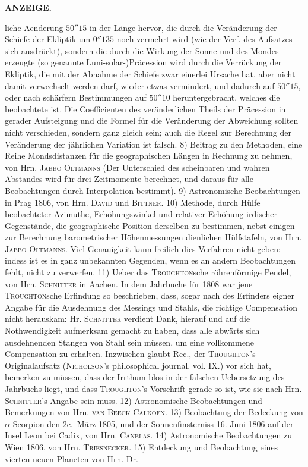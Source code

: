 \clearpage
\thispagestyle{empty}
\noindent{}%
%
\parbox[t]{\dimexpr\linewidth-24mm\relax}{\centering\footnotesize\bfseries ANZEIGE.\par}%
\makebox[12mm][r]{}\par\nobreak\medskip
\noindent liche Aenderung $50''15$ in der Länge hervor, die durch die Veränderung der Schiefe der Ekliptik um $0''135$ noch vermehrt wird (wie der Verf. des Aufsatzes sich ausdrückt), sondern die durch die Wirkung der Sonne und des Mondes erzeugte (so genannte Luni-solar-)Präcession wird durch die Verrückung der Ekliptik, die mit der Abnahme der Schiefe zwar einerlei Ursache hat, aber nicht damit verwechselt werden darf, wieder etwas vermindert, und dadurch auf $50''15$, oder nach schärfern Bestimmungen auf $50''10$ heruntergebracht, welches die beobachtete ist. Die Coefficienten des veränderlichen Theils der Präcession in gerader Aufsteigung und die Formel für die Veränderung der Abweichung sollten nicht verschieden, sondern ganz gleich sein; auch die Regel zur Berechnung der Veränderung der jährlichen Variation ist falsch. 8) Beitrag zu den Methoden, eine Reihe Mondsdistanzen für die geographischen Längen in Rechnung zu nehmen, von Hrn. \textsc{Jabbo Oltmanns} (Der Unterschied des scheinbaren und wahren Abstandes wird für drei Zeitmomente berechnet, und daraus für alle Beobachtungen durch Interpolation bestimmt). 9) Astronomische Beobachtungen in Prag 1806, von Hrn. \textsc{David} und \textsc{Bittner}. 10) Methode, durch Hülfe beobachteter Azimuthe, Erhöhungswinkel und relativer Erhöhung irdischer Gegenstände, die geographische Position derselben zu bestimmen, nebst einigen zur Berechnung barometrischer Höhenmessungen dienlichen Hülfstafeln, von Hrn. \textsc{Jabbo Oltmanns}. Viel Genauigkeit kann freilich dies Verfahren nicht geben: indess ist es in ganz unbekannten Gegenden, wenn es an andern Beobachtungen fehlt, nicht zu verwerfen. 11) Ueber das \textsc{Troughton}sche röhrenförmige Pendel, von Hrn. \textsc{Schnitter} in Aachen. In dem Jahrbuche für 1808 war jene \textsc{Troughton}sche Erfindung so beschrieben, dass, sogar nach des Erfinders eigner Angabe für die Ausdehnung des Messings und Stahls, die richtige Compensation nicht herauskam: Hr. \textsc{Schnitter} verdient Dank, hierauf und auf die Nothwendigkeit aufmerksam gemacht zu haben, dass alle abwärts sich ausdehnenden Stangen von Stahl sein müssen, um eine vollkommene Compensation zu erhalten. Inzwischen glaubt Rec., der \textsc{Troughton}'s Originalaufsatz (\textsc{Nicholson}'s philosophical journal. vol. IX.) vor sich hat, bemerken zu müssen, dass der Irrthum blos in der falschen Uebersetzung des Jahrbuchs liegt, und dass \textsc{Troughton}'s Vorschrift gerade so ist, wie sie nach Hrn. \textsc{Schnitter}'s Angabe sein muss. 12) Astronomische Beobachtungen und Bemerkungen von Hrn. \textsc{van Beeck Calkoen}. 13) Beobachtung der Bedeckung von $\alpha$ Scorpion den 2c.\ März 1805, und der Sonnenfinsterniss 16. Juni 1806 auf der Insel Leon bei Cadix, von Hrn. \textsc{Canelas}. 14) Astronomische Beobachtungen zu Wien 1806, von Hrn. \textsc{Triesnecker}. 15) Entdeckung und Beobachtung eines vierten neuen Planeten von Hrn. Dr. 